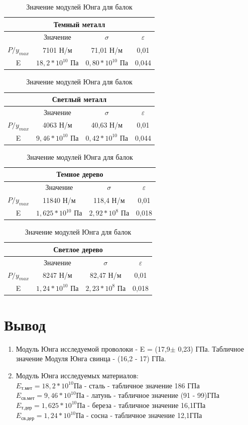 \documentclass[a4paper,14pt]{extarticle}
\begin{document}
\begin{enumerate}
\begin{table}[H]
		\centering
			\begin{tabular}{|c|c|c|c|}
				\hline
				\multicolumn{4}{|c|}{Темный металл}\\
				\hline
				&Значение&$\sigma$&$\varepsilon$\\
				\hline
				$P/y_{max}$&7101 Н/м&71,01 Н/м&0,01\\
				\hline
				E&$18,2*10^{10}$ Па& $0,80*10^{10}$ Па&0,044\\
				\hline
			\end{tabular}
			\begin{tabular}{|c|c|c|c|}
				\hline
				\multicolumn{4}{|c|}{Светлый металл}\\
				\hline
				&Значение&$\sigma$&$\varepsilon$\\
				\hline
				$P/y_{max}$&4063 Н/м&40,63 Н/м&0,01\\
				\hline
				E&$9,46*10^{10}$ Па& $0,42*10^{10}$ Па&0,044\\
				\hline
			\end{tabular}
			\begin{tabular}{|c|c|c|c|}
				\hline
				\multicolumn{4}{|c|}{Темное дерево}\\
				\hline
				&Значение&$\sigma$&$\varepsilon$\\
				\hline
				$P/y_{max}$&11840 Н/м&118,4 Н/м&0,01\\
				\hline
				E&$1,625*10^{10}$ Па& $2,92*10^{8}$ Па&0,018\\
				\hline
			\end{tabular}
			\begin{tabular}{|c|c|c|c|}
				\hline
				\multicolumn{4}{|c|}{Светлое дерево}\\
				\hline
				&Значение&$\sigma$&$\varepsilon$\\
				\hline
				$P/y_{max}$&8247 Н/м&82,47 Н/м&0,01\\
				\hline
				E&$1,24*10^{10}$ Па& $2,23*10^{8}$ Па&0,018\\
				\hline
			\end{tabular}	
		\caption{Значение модулей Юнга для балок}
	\end{table}
\end{enumerate}
\section{Вывод}
\begin{enumerate}
	\item Модуль Юнга исследуемой проволоки - E = (17,9$\pm$ 0,23) ГПа. Табличное значение Модуля Юнга свинца - (16,2 - 17) ГПа.  
	\item Модуль Юнга исследуемых материалов:
	\\$E_\text{т.мет} = 18,2*10^{10}\text{Па}$ - сталь - табличное значение 186 ГПа
	\\$E_\text{св.мет} = 9,46*10^{10}\text{Па}$ - латунь - табличное значение (91 - 99)ГПа
	\\$E_\text{т.дер} = 1,625*10^{10}\text{Па}$ - береза - табличное значение 16,1ГПа
	\\$E_\text{св.дер} = 1,24*10^{10}\text{Па}$ - сосна - табличное значение 12,1ГПа
\end{enumerate}
\end{document}
